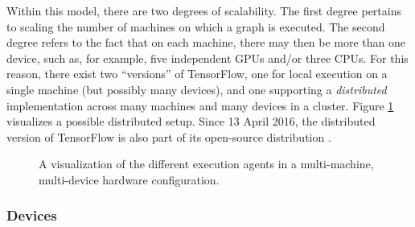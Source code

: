 Within this model, there are two degrees of scalability. The first degree
pertains to scaling the number of machines on which a graph is executed. The
second degree refers to the fact that on each machine, there may then be more
than one device, such as, for example, five independent GPUs and/or three
CPUs. For this reason, there exist two ``versions'' of TensorFlow, one for local
execution on a single machine (but possibly many devices), and one supporting a
\emph{distributed} implementation across many machines and many devices in a
cluster. Figure \ref{fig:exec} visualizes a possible distributed setup. Since 13
April 2016, the distributed version of TensorFlow is also part of its
open-source distribution \cite{tensorflowdist}.

\begin{figure}
  \label{fig:exec}
  \caption{A visualization of the different execution agents in a multi-machine,
    multi-device hardware configuration.}
\end{figure}

\subsubsection{Devices}\label{sec:model-exec-devices}

